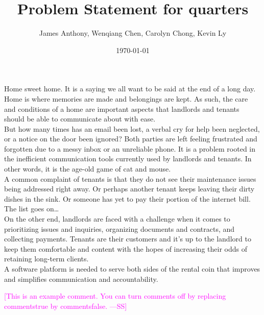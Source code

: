 \documentclass[12pt]{article}
\newcommand{\authornote}[3]{\textcolor{#1}{[#3 ---#2]}}
\newcommand{\authornote}[3]{}
\newcommand{\wss}[1]{\authornote{magenta}{SS}{#1}}
\begin{document}
\title{Problem Statement for quarters} 
\author{James Anthony, Wenqiang Chen, Carolyn Chong, Kevin Ly}
\date{\today}
	
\maketitle

Home sweet home. It is a saying we all want to be said at the end of a long day. Home is where memories are made and belongings are kept. As such, the care and conditions of a home are important aspects that landlords and tenants should be able to communicate about with ease. \\

But how many times has an email been lost, a verbal cry for help been neglected, or a notice on the door been ignored? Both parties are left feeling frustrated and forgotten due to a messy inbox or an unreliable phone. It is a problem rooted in the inefficient communication tools currently used by landlords and tenants. In other words, it is the age-old game of cat and mouse.\\
 
A common complaint of tenants is that they do not see their maintenance issues being addressed right away. Or perhaps another tenant keeps leaving their dirty dishes in the sink. Or someone has yet to pay their portion of the internet bill. The list goes on\ldots \\

On the other end, landlords are faced with a challenge when it comes to prioritizing issues and inquiries, organizing documents and contracts, and collecting payments. Tenants are their customers and it's up to the landlord to keep them comfortable and content with the hopes of increasing their odds of retaining long-term clients.\\

A software platform is needed to serve both sides of the rental coin that improves and simplifies communication and accountability.




\wss{This is an example comment.  You can turn comments off by replacing
  commentstrue by commentsfalse.}
\end{document}
